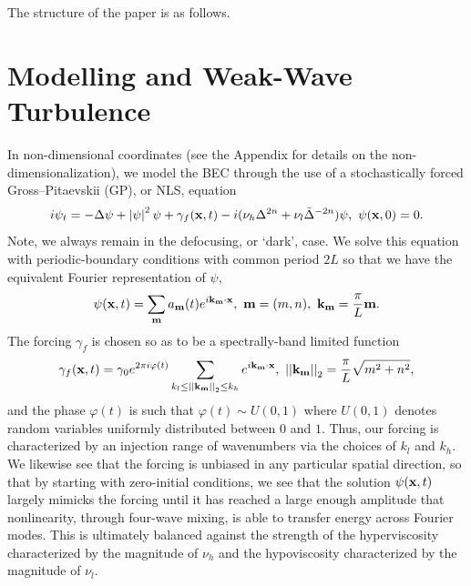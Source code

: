 \documentclass[aps,prl,preprint,groupedaddress]{revtex4-1}
\newcommand{\gnorm}[1]{\left|\left| #1\right|\right|}
\begin{document}
The structure of the paper is as follows.  

\section*{Modelling and Weak-Wave Turbulence}

In non-dimensional coordinates (see the Appendix for details on the non-dimensionalization), we model the BEC through the use of a stochastically forced Gross--Pitaevskii (GP), or NLS, equation 
\[
i\psi_{t} = -\Delta \psi +  \left| \psi\right|^{2}\psi + \gamma_{f}({\bf x},t) - i(\nu_{h}\Delta^{2n}+\nu_{l}\tilde{\Delta}^{-2n})\psi, ~ \psi({\bf x},0)=0.
\]
Note, we always remain in the defocusing, or `dark', case.  We solve this equation with periodic-boundary conditions with common period $2L$ so that we have the equivalent Fourier representation of $\psi$,
\[
\psi({\bf x},t) = \sum_{{\bf m}} a_{{\bf m}}(t) e^{ i {\bf k}_{{\bf m}}\cdot {\bf x}}, ~ {\bf m} = (m,n), ~ {\bf k}_{{\bf m}} = \frac{\pi}{L}{\bf m}.
\]
The forcing $\gamma_{f}$ is chosen so as to be a spectrally-band limited function 
\[
\gamma_{f}({\bf x},t) = \gamma_{0}e^{2\pi i\varphi(t)}\sum_{k_{l}\leq \gnorm{{\bf k}_{{\bf m}}}_{2} \leq k_{h}} e^{i {\bf k}_{{\bf m}}\cdot {\bf x}}, ~ \gnorm{{\bf k}_{{\bf m}}}_{2} = \frac{\pi}{L}\sqrt{m^{2}+n^{2}},
\]
and the phase $\varphi(t)$ is such that $\varphi(t)  \sim U(0,1)$ where $U(0,1)$ denotes random variables uniformly distributed between $0$ and $1$.  Thus, our forcing is characterized by an injection range of wavenumbers via the choices of $k_{l}$ and $k_{h}$.  We likewise see that the forcing is unbiased in any particular spatial direction, so that by starting with zero-initial conditions, we see that the solution $\psi({\bf x},t)$ largely mimicks the forcing until it has reached a large enough amplitude that nonlinearity, through four-wave mixing, is able to transfer energy across Fourier modes.  This is ultimately balanced against the strength of the hyperviscosity characterized by the magnitude of $\nu_{h}$ and the hypoviscosity characterized by the magnitude of $\nu_{l}$.   
\end{document}
